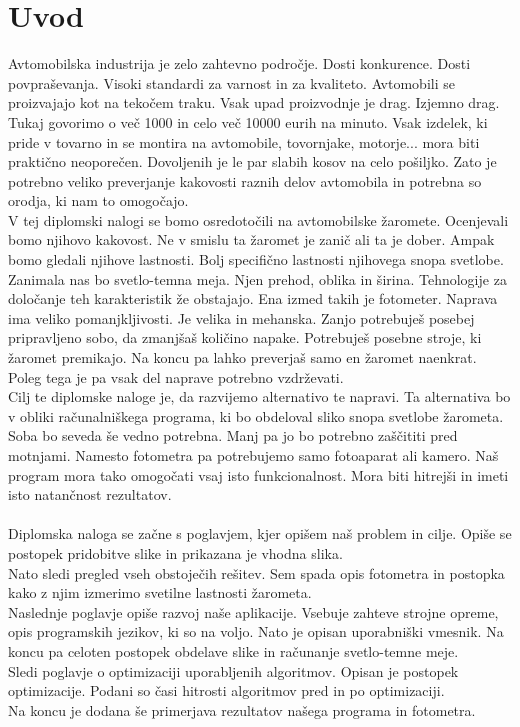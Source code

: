 \documentclass[oneside, a4paper, 12pt]{book}
\begin{document}
\chapter{Uvod}
Avtomobilska industrija je zelo zahtevno področje. Dosti konkurence. Dosti povpraševanja. Visoki standardi za varnost in za kvaliteto. Avtomobili se proizvajajo kot na tekočem traku. Vsak upad proizvodnje je drag. Izjemno drag. Tukaj govorimo o več 1000 in celo več 10000 eurih na minuto. Vsak izdelek, ki pride v tovarno in se montira na avtomobile, tovornjake, motorje... mora biti praktično neoporečen. Dovoljenih je le par slabih kosov na celo pošiljko. Zato je potrebno veliko preverjanje kakovosti raznih delov avtomobila in potrebna so orodja, ki nam to omogočajo.\\
V tej diplomski nalogi se bomo osredotočili na avtomobilske žaromete. Ocenjevali bomo njihovo kakovost. Ne v smislu ta žaromet je zanič ali ta je dober. Ampak bomo gledali njihove lastnosti. Bolj specifično lastnosti njihovega snopa svetlobe. \\
Zanimala nas bo svetlo-temna meja. Njen prehod, oblika in širina. Tehnologije za določanje teh karakteristik že obstajajo. Ena izmed takih je fotometer. Naprava ima veliko pomanjkljivosti. Je velika in mehanska. Zanjo potrebuješ posebej pripravljeno sobo, da zmanjšaš količino napake. Potrebuješ posebne stroje, ki žaromet premikajo. Na koncu pa lahko preverjaš samo en žaromet naenkrat. Poleg tega je pa vsak del naprave potrebno vzdrževati.\\
Cilj te diplomske naloge je, da razvijemo alternativo te napravi. Ta alternativa bo v obliki računalniškega programa, ki bo obdeloval sliko snopa svetlobe žarometa. Soba bo seveda še vedno potrebna. Manj pa jo bo potrebno zaščititi pred motnjami. Namesto fotometra pa potrebujemo samo fotoaparat ali kamero. Naš program mora tako omogočati vsaj isto funkcionalnost. Mora biti hitrejši in imeti isto natančnost rezultatov.\\
\\
Diplomska naloga se začne s poglavjem, kjer opišem naš problem in cilje. Opiše se postopek pridobitve slike in prikazana je vhodna slika.\\
Nato sledi pregled vseh obstoječih rešitev. Sem spada opis fotometra in postopka kako z njim izmerimo svetilne lastnosti žarometa.\\
Naslednje poglavje opiše razvoj naše aplikacije. Vsebuje zahteve strojne opreme, opis programskih jezikov, ki so na voljo. Nato je opisan uporabniški vmesnik. Na koncu pa celoten postopek obdelave slike in računanje svetlo-temne meje.\\
Sledi poglavje o optimizaciji uporabljenih algoritmov. Opisan je postopek optimizacije. Podani so časi hitrosti algoritmov pred in po optimizaciji.\\
Na koncu je dodana še primerjava rezultatov našega programa in fotometra.
\end{document}
